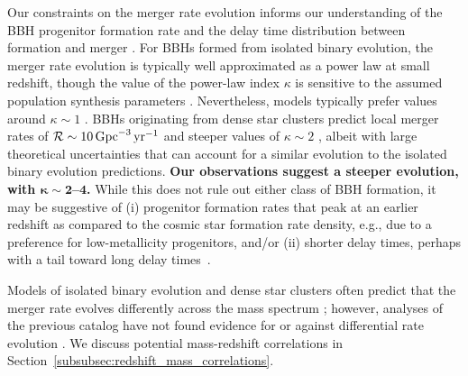 Our constraints on the merger rate evolution informs our understanding of the \ac{BBH} progenitor formation rate and the delay time distribution between formation and merger \citep{Vitale:2018yhm,Rodriguez:2018rmd, Fragione:2018vty,Fishbach:2018edt, Baibhav:2019gxm, Romero-Shaw:2020siz,Broekgaarden:2021efa,Mapelli:2021gyv,Fishbach:2021mhp,Chruslinska:2022ovf,Fishbach:2023xws,Boesky:2024msm}. 
For \acp{BBH} formed from isolated binary evolution, the merger rate evolution is typically well approximated as a power law at small redshift, though the value of the power-law index $\kappa$ is sensitive to the assumed population synthesis parameters \citep{Neijssel:2019irh, Broekgaarden:2021efa, Gallegos-Garcia:2021hti, deSa:2024otm}.
Nevertheless, models typically prefer values around $\kappa\sim 1$ \citep{Dominik:2013tma, Baibhav:2019gxm}. 
\acp{BBH} originating from dense star clusters predict local merger rates of $\mathcal{R}\sim 10\,\mathrm{Gpc}^{-3}\,\mathrm{yr}^{-1}$ \citep{Sedda:2023qlx} and steeper values of $\kappa \sim 2$ \citep{Antonini:2020xnd}, albeit with large theoretical uncertainties that can account for a similar evolution to the isolated binary evolution predictions.
{\textbf{\boldmath Our observations suggest a steeper evolution, with $\bm{\kappa\sim 2}$--$\bm{4}$.}}
While this does not rule out either class of \ac{BBH} formation, it may be suggestive of (i) progenitor formation rates that peak at an earlier redshift as compared to the cosmic star formation rate density, e.g., due to a preference for low-metallicity progenitors, and/or (ii) shorter delay times, perhaps with a tail toward long delay times~\citep{Fishbach:2021mhp, Karathanasis:2022rtr,Fishbach:2023pqs, Turbang:2023tjk,Vijaykumar:2023bgs,Schiebelbein-Zwack:2024roj}.

Models of isolated binary evolution and dense star clusters often predict that the merger rate evolves differently across the mass spectrum \citep{vanSon:2021zpk, Mapelli:2021gyv, Ye:2024ypm};
however, analyses of the previous catalog have not found evidence for or against differential rate evolution \citep{Fishbach:2021yvy,Sadiq:2021fin, vanSon:2021zpk, Ray:2023upk, Heinzel:2024hva, Sadiq:2025aog}.
We discuss potential mass-redshift correlations in Section~\ref{subsubsec:redshift_mass_correlations}.